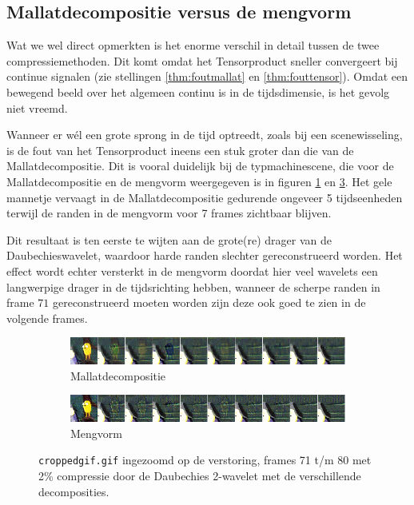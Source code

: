 \subsection{Mallatdecompositie versus de mengvorm}
\vspace{-10pt}
Wat we wel direct opmerkten is het enorme verschil in detail tussen de twee compressiemethoden. 
Dit komt omdat het Tensorproduct sneller convergeert bij continue signalen 
(zie stellingen \ref{thm:foutmallat} en \ref{thm:fouttensor}). 
Omdat een bewegend beeld over het algemeen continu is in de tijdsdimensie, is het gevolg niet vreemd.

\vspace{-3pt}
Wanneer er w\'el een grote sprong in de tijd optreedt, zoals bij een scenewisseling, is de fout van 
het Tensorproduct ineens een stuk groter dan die van de Mallatdecompositie. 
Dit is vooral duidelijk bij de typmachinescene, die voor de Mallatdecompositie en de mengvorm
weergegeven is in figuren \ref{fig:frames_tensor} en \ref{fig:frames_nontensor}.
Het gele mannetje vervaagt in de Mallatdecompositie gedurende ongeveer 5 tijdseenheden 
terwijl de randen in de mengvorm voor 7 frames zichtbaar blijven.

\vspace{-3pt}
Dit resultaat is ten eerste te wijten aan de grote(re) drager van de Daubechieswavelet, 
waardoor harde randen slechter gereconstrueerd worden.
Het effect wordt echter versterkt in de mengvorm doordat hier veel wavelets een langwerpige
drager in de tijdsrichting hebben, wanneer de scherpe randen in frame $71$ gereconstrueerd moeten worden
zijn deze ook goed te zien in de volgende frames.

\vspace{-7pt}
\begin{figure}[h]
\centering
\begin{subfigure}{\linewidth}
\includegraphics[width=\linewidth]{plaatjes/frames_notensor_small.png}
\caption{Mallatdecompositie}
\label{fig:frames_tensor}
\end{subfigure}
\centering
\begin{subfigure}{\linewidth}
\includegraphics[width=\linewidth]{plaatjes/frames_tensor_small.png}
\caption{Mengvorm}
\label{fig:frames_nontensor}
\end{subfigure}
\caption{\texttt{croppedgif.gif} ingezoomd op de verstoring, frames 71 t/m 80 met 2\% compressie door de Daubechies 2-wavelet
met de verschillende decomposities.}
\end{figure}
